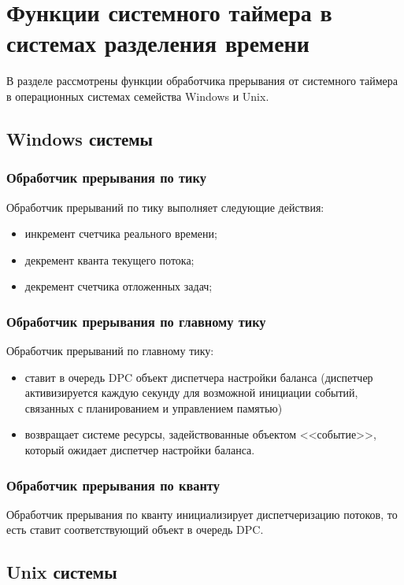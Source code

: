 \chapter{Функции системного таймера \newline в системах разделения времени}
В разделе рассмотрены функции обработчика прерывания от системного таймера в операционных системах семейства Windows и Unix. 
\section{Windows системы}
\subsection{Обработчик прерывания по тику}
Обработчик прерываний по тику выполняет следующие действия:
\begin{itemize}
	\item инкремент счетчика реального времени;
	\item декремент кванта текущего потока;
	\item декремент счетчика отложенных задач;
	
\end{itemize}
\subsection{Обработчик прерывания по главному тику}

Обработчик прерываний по главному тику:
\begin{itemize}
	\item ставит в очередь DPC объект диспетчера настройки баланса (диспетчер активизируется каждую секунду для возможной инициации событий, связанных с планированием и управлением памятью)
	\item возвращает системе ресурсы, задействованные объектом <<событие>>, который ожидает диспетчер настройки баланса.
\end{itemize}
 

\subsection{Обработчик прерывания по кванту}
Обработчик прерывания по кванту инициализирует диспетчеризацию потоков, то есть ставит соответствующий объект в очередь DPC.
\section{Unix системы}
